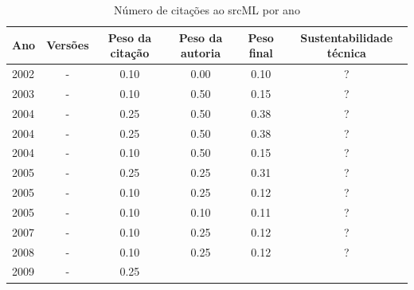 \begin{table}[H]
\caption{Número de citações ao srcML por ano}
\centering
\begin{tabular}{| l | c | c | c | c | c |}
  \hline
  Ano & Versões & Peso da citação & Peso da autoria & Peso final & Sustentabilidade técnica \\
  \hline
            2002
          &
          -
          &
          0.10
          &
          0.00
          &
            {\color{red} 0.10}
          &
          ?
          \\
\hline
            2003
          &
          -
          &
          0.10
          &
          0.50
          &
            {\color{red} 0.15}
          &
          ?
          \\
\hline
            2004
          &
          -
          &
          0.25
          &
          0.50
          &
            {\color{red} 0.38}
          &
          ?
          \\
            2004
          &
          -
          &
          0.25
          &
          0.50
          &
            {\color{red} 0.38}
          &
          ?
          \\
            2004
          &
          -
          &
          0.10
          &
          0.50
          &
            {\color{red} 0.15}
          &
          ?
          \\
\hline
            2005
          &
          -
          &
          0.25
          &
          0.25
          &
            {\color{red} 0.31}
          &
          ?
          \\
            2005
          &
          -
          &
          0.10
          &
          0.25
          &
            {\color{red} 0.12}
          &
          ?
          \\
            2005
          &
          -
          &
          0.10
          &
          0.10
          &
            {\color{red} 0.11}
          &
          ?
          \\
\hline
            2007
          &
          -
          &
          0.10
          &
          0.25
          &
            {\color{red} 0.12}
          &
          ?
          \\
\hline
            2008
          &
          -
          &
          0.10
          &
          0.25
          &
            {\color{red} 0.12}
          &
          ?
          \\
\hline
            2009
          &
          -
          &
          0.25

\end{tabular}
\end{table}
